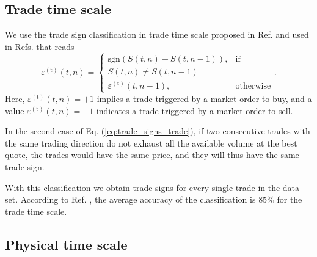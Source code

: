 \subsection{Trade time scale}\label{subsec:trade_time}

We use the trade sign classification in trade time scale proposed in Ref.
\cite{Wang_2016_cross} and used in Refs.
\cite{my_paper_response_financial,Wang_2016_avg,Wang_2017,Wang_2018_copulas}
that reads
\begin{equation}\label{eq:trade_signs_trade}
    \varepsilon^{\left(\textrm{t}\right)}\left(t,n\right)=\left\{
    \begin{array}{cc}
    \text{sgn}\left(S\left(t,n\right)-S\left(t,n-1\right)\right),
    & \text{if }\\ S\left(t,n\right) \ne S\left(t,n-1\right)\\
    \varepsilon^{\left(\textrm{t}\right)}\left(t,n-1\right),
    & \text{otherwise}
    \end{array}\right..
\end{equation}
Here, $\varepsilon^{\left(\textrm{t}\right)}\left( t,n \right) = +1$ implies a
trade triggered by a market order to buy, and a value
$\varepsilon^{\left(\textrm{t}\right)}\left( t,n \right) = -1$ indicates a trade
triggered by a market order to sell.

In the second case of Eq. (\ref{eq:trade_signs_trade}), if two consecutive
trades with the same trading direction do not exhaust all the available volume
at the best quote, the trades would have the same price, and they will thus
have the same trade sign.

With this classification we obtain trade signs for every single trade in the
data set. According to Ref. \cite{Wang_2016_cross}, the average accuracy of the
classification is $85\%$ for the trade time scale.

\subsection{Physical time scale}\label{subsec:physical_time}

